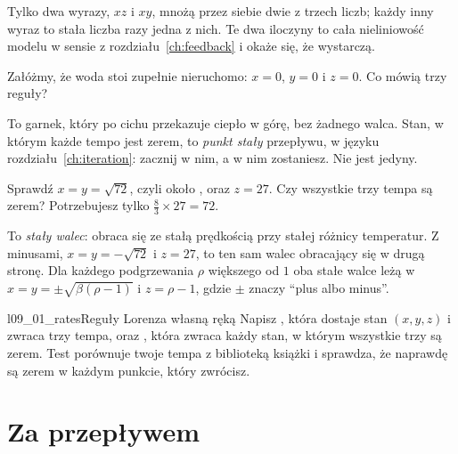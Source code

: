 \noindent
Tylko dwa wyrazy, $xz$ i $xy$, mnożą przez siebie dwie z trzech liczb; każdy
inny wyraz to stała liczba razy jedna z nich. Te dwa iloczyny to cała
nieliniowość modelu w sensie z rozdziału~\ref{ch:feedback} i okaże się, że
wystarczą.


\begin{think}
Załóżmy, że woda stoi zupełnie nieruchomo: $x = 0$, $y = 0$ i $z = 0$. Co
mówią trzy reguły?
\end{think}
To garnek, który po cichu przekazuje ciepło w górę, bez żadnego walca. Stan, w
którym każde tempo jest zerem, to \emph{punkt stały} przepływu, w języku
rozdziału~\ref{ch:iteration}: zacznij w nim, a w nim zostaniesz. Nie jest
jedyny.

\begin{think}
Sprawdź $x = y = \sqrt{72}$, czyli około , oraz $z = 27$.
Czy wszystkie trzy tempa są zerem? Potrzebujesz tylko
$\tfrac{8}{3} \times 27 = 72$.
\end{think}
To \emph{stały walec}: obraca się ze stałą prędkością przy stałej różnicy
temperatur. Z minusami, $x = y = -\sqrt{72}$ i $z = 27$, to ten sam walec
obracający się w drugą stronę. Dla każdego podgrzewania $\rho$ większego od $1$ oba
stałe walce leżą w $x = y = \pm\sqrt{\beta(\rho - 1)}$ i $z = \rho - 1$,
gdzie $\pm$ znaczy \enquote{plus albo minus}.

\begin{lab}{l09_01_rates}{Reguły Lorenza własną ręką}
Napisz , która dostaje stan $(x, y, z)$ i zwraca trzy tempa,
oraz , która zwraca każdy stan, w którym wszystkie trzy
są zerem. Test porównuje twoje tempa z biblioteką książki i sprawdza, że
naprawdę są zerem w każdym punkcie, który zwrócisz.
\end{lab}

\section{Za przepływem}
\label{sec:ch09-flow}


